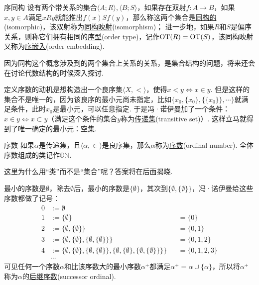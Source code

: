\documentclass[main.tex]{subfiles}
\begin{document}
\begin{definition}{序同构}
    设有两个带关系的集合\(\langle A; R \rangle, \langle B; S \rangle\)，如果存在双射\(f:A \to B\)，如果\(x,y \in A\)满足\(x R y\)就能推出\(f(x) S f(y)\)，那么称这两个集合是\uline{同构的}(isomorphic)，该双射称为\uline{同构映射}(isomorphism)；\newline
    进一步地，如果\(R\)和\(S\)是偏序关系，则称它们拥有相同的\uline{序型}(order type)，记作\({\rm OT}(R) = {\rm OT}(S)\)，该同构映射又称为\uline{序嵌入}(order-embedding).
\end{definition}

因为同构这个概念涉及到的两个集合上关系的关系，是集合结构的问题，将来还会在讨论代数结构的时候深入探讨.

定义序数的动机是想构造出一个良序集\(\langle X,< \rangle\)，使得\(x < y \Leftrightarrow x \in y\). 但是这样的集合不是唯一的，因为该良序的最小元尚未指定，比如\(\{x_0,\{x_0\},\{\{x_0\}\}, \cdots\}\)就满足条件，此时\(x_0\)是最小元，可以任意指定. 于是冯·诺伊曼加了一个条件：\(x\in y \Leftrightarrow x \subset y\)（满足这个条件的集合\(y\)称为\uline{传递集}(transitive set)）. 这样立马就得到了唯一确定的最小元：空集.

\begin{definition}{序数}
    如果\(\alpha\)是传递集，且\(\langle \alpha,\in \rangle\)是良序集，那么\(\alpha\)称为\uline{序数}(ordinal number). 全体序数组成的类记作\(\mathbb{ON}\).
\end{definition}
这里为什么用“类”而不是“集合”呢？答案将在后面揭晓.

最小的序数是\(\emptyset\)，除去\(\emptyset\)后，最小的序数是\(\{\emptyset\}\)，其次到\(\{\emptyset,\{\emptyset\}\}\)，冯·诺伊曼给这些序数都做了记号：
\begin{align*}
    0 & := \emptyset &&\\
    1 & := \{\emptyset\} &&= \{0\}\\
    2 & := \{\emptyset,\{\emptyset\}\} &&= \{0,1\}\\
    3 & := \{\emptyset,\{\emptyset\},\{\emptyset,\{\emptyset\}\}\} &&= \{0,1,2\}\\
    4 & := \{\emptyset,\{\emptyset\},\{\emptyset,\{\emptyset\}\},\{\emptyset,\{\emptyset\},\{\emptyset,\{\emptyset\}\}\}\} &&= \{0,1,2,3\}\\
    & \cdots
\end{align*}
可见任何一个序数\(\alpha\)和比该序数大的最小序数\(\alpha^+\)都满足\(\alpha^+=\alpha \cup \{\alpha\}\)，所以将\(\alpha^+\)称为\(\alpha\)的\uline{后继序数}(successor ordinal).
\end{document}
